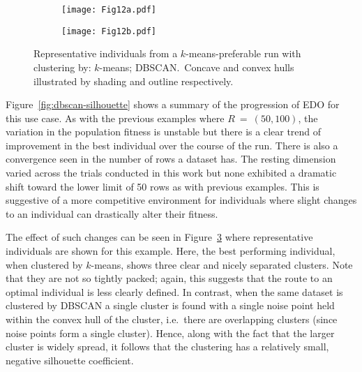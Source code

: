 \begin{figure}
    \centering
    \begin{subfigure}{\imgwidth}
        \texttt{[image: Fig12a.pdf]}
        \caption{}\label{fig:dbscan-inds-k}
    \end{subfigure}

    \begin{subfigure}{\imgwidth}
        \texttt{[image: Fig12b.pdf]}
        \caption{}\label{fig:dbscan-inds-d}
    \end{subfigure}
    \caption{%
        Representative individuals from a \(k\)-means-preferable run with
        clustering by:  \(k\)-means;
         DBSCAN.\ Concave and convex hulls illustrated
        by shading and outline respectively.
    }\label{fig:dbscan-inds}
\end{figure}

Figure~\ref{fig:dbscan-silhouette} shows a summary of the progression of EDO
for this use case. As with the previous examples where \(R~=~(50, 100)\), the
variation in the population fitness is unstable but there is a clear trend of
improvement in the best individual over the course of the run. There is also a
convergence seen in the number of rows a dataset has. The resting dimension
varied across the trials conducted in this work but none exhibited a dramatic
shift toward the lower limit of 50 rows as with previous examples. This is
suggestive of a more competitive environment for individuals where slight
changes to an individual can drastically alter their fitness.

The effect of such changes can be seen in Figure~\ref{fig:dbscan-inds} where
representative individuals are shown for this example. Here, the best performing
individual, when clustered by \(k\)-means, shows three clear and nicely
separated clusters. Note that they are not so tightly packed; again, this
suggests that the route to an optimal individual is less clearly defined. In
contrast, when the same dataset is clustered by DBSCAN a single cluster is found
with a single noise point held within the convex hull of the cluster, i.e.\
there are overlapping clusters (since noise points form a single cluster).
Hence, along with the fact that the larger cluster is widely spread, it follows
that the clustering has a relatively small, negative silhouette coefficient.

